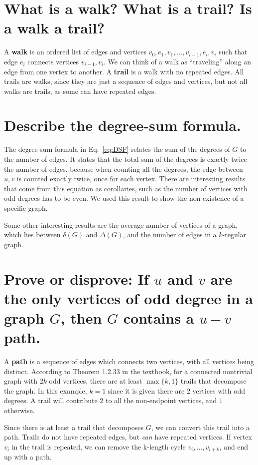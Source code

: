 \documentclass{article}
\begin{document}
\section{What is a walk? What is a trail? Is a walk a trail?}
A \textbf{walk} is an ordered list of edges and vertices $v_0, e_1, v_1, \dots,v_{i-1}, e_{i}, v_{i}$ such that edge $e_i$
connects vertices $v_{i-1}, v_i$.
We can think of a walk as ``traveling'' along an edge from one vertex to another.
A \textbf{trail} is a walk with no repeated edges.
All trails are walks, since they are just a sequence of edges and vertices, but not all walks are trails, as some
can have repeated edges.

\section{Describe the degree-sum formula.}
The degree-sum formula in Eq.~\ref{eq:DSF} relates the sum of the degrees of $G$ to the number of edges.
It states that the total sum of the degrees is exactly twice the number of edges, because when counting all the degrees,
the edge between $u,v$ is counted exactly twice, once for each vertex.
There are interesting results that come from this equation as corollaries, such as the number of vertices with odd
degrees has to be even.
We used this result to show the non-existence of a specific graph.

Some other interesting results are the average number of vertices of a graph, which lies between $\delta(G)$ and $\Delta(G)$,
and the number of edges in a $k$-regular graph.

\section{Prove or disprove: If $u$ and $v$ are the only vertices of odd degree in a graph $G$, then $G$ contains a $u-v$ path.}
A \textbf{path} is a sequence of edges which connects two vertices, with all vertices being distinct.
According to Theorem 1.2.33 in the textbook, for a connected nontrivial graph with $2k$ odd vertices, there are at least
$\max\{k, 1\}$ trails that decompose the graph.
In this example, $k=1$ since it is given there are $2$ vertices with odd degrees.
A trail will contribute $2$ to all the non-endpoint vertices, and $1$ otherwise.

Since there is at least a trail that decomposes $G$, we can convert this trail into a path.
Trails do not have repeated edges, but \emph{can} have repeated vertices.
If vertex $v_i$ in the trail is repeated, we can remove the k-length cycle $v_i,\dots,v_{i+k}$, and end up with a path.
\end{document}
